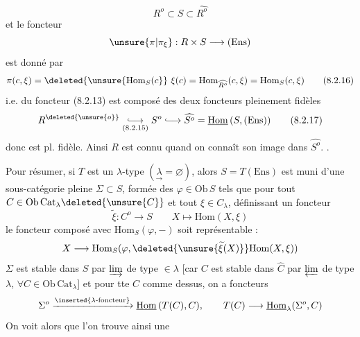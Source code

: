 \[
 R^o\subset S\subset\widehat{R^o}\tag*{(8.2.15)}
\]
 et le foncteur
\[
 \unsure{\pi|\pi_{\xi}}:R\times S\longrightarrow(\mathrm{Ens})
\]
est donné par
\[
 \pi(c,\xi)=\deleted{\unsure{\mathrm{Hom}_{S}(c}}\ \xi(c)=\mathrm{Hom}_{\widehat{R^o}}(c,\xi)=\mathrm{Hom}_{S}(c,\xi)\tag*{(8.2.16)}
\]
i.e.  du foncteur (8.2.13) est 
 composé des deux foncteurs pleinement fidèles
\[
 R^{\deleted{\unsure{o}}}\underset{(8.2.15)}{\lhook\joinrel\longrightarrow}S^o\lhook\joinrel\longrightarrow\widehat{S^o}=\underline{\mathrm{Hom}}\,(S,(\mathrm{Ens}))\tag*{(8.2.17)}
\]
donc est pl. fidèle. Ainsi $R$ est connu  quand
on connaît son image dans $\widehat{S^o}$. .

Pour résumer, si $T$ est un $\lambda$-type $(\underset{\rightarrow}{\lambda}=\varnothing)$, alors
 $S=T(\mathrm{Ens})$ est muni d'une sous-catégorie
pleine $\Sigma\subset S$, formée des $\varphi\in\mathrm{Ob}\,S$ tels que pour
tout $C\in\mathrm{Ob}\,\mathrm{Cat}_{\lambda}\deleted{\unsure{C}}$ et tout  $\xi\in C_\lambda$, 
 définissant un  foncteur
\[
 \widetilde\xi:C^o\longrightarrow S\qquad X\longmapsto\mathrm{Hom}(X,\xi)
\]
le foncteur composé avec $\mathrm{Hom}_S(\varphi,-)$ soit
représentable :
\[
 X\longrightarrow\mathrm{Hom}_S(\varphi,\deleted{\unsure{\widetilde\xi(X)}}\mathrm{Hom}(X,\xi))
\]
$\Sigma$ est stable dans $S$ par $\varinjlim$  de type $\in\lambda$ \deleted{\unsure{\xi}} [car $C$
est stable dans $\widehat C$ par $\varprojlim$ de type $\lambda$, $\forall C\in\mathrm{Ob}\,\mathrm{Cat}_{\lambda}$]
et pour tte $C$ comme dessus, on a  foncteurs
\[
 \Sigma^o\xrightarrow{\inserted{\lambda\text{-foncteur}}}\underline{\mathrm{Hom}}\,(T(C),C),\qquad T(C)\longrightarrow\underline{\mathrm{Hom}}_\lambda(\Sigma^o,C)
\]
On voit alors que l'on trouve ainsi une
